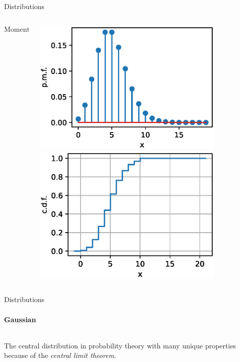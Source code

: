 {\begin{frame}{Distributions}
\begin{columns}[onlytextwidth]
\begin{column}{0.57\textwidth}
\begin{boxed}
                    $$\text{Moments:}\qquad \displaystyle \mu_X = \lambda \quad \sigma_X^2 = \lambda$$
                \end{boxed}
            \end{column}
            \begin{column}{0.43\textwidth}
                \begin{center}
                    \includegraphics[width=0.8\textwidth]{fig/prob_poisson_pmf.eps}
                    \includegraphics[width=0.8\textwidth]{fig/prob_poisson_cdf.eps}
                \end{center}
            \end{column}
        \end{columns}
    \end{frame}

    \begin{frame}{Distributions}
        \framesubtitle{Gaussian}
        \vspace*{-4mm}

        \begin{columns}[onlytextwidth]
            \begin{column}{0.5\textwidth}
                The central distribution in probability theory with many unique properties because of
                the \emph{central limit theorem}.\\[1mm]


\end{column}
\end{columns}
\end{frame}}
